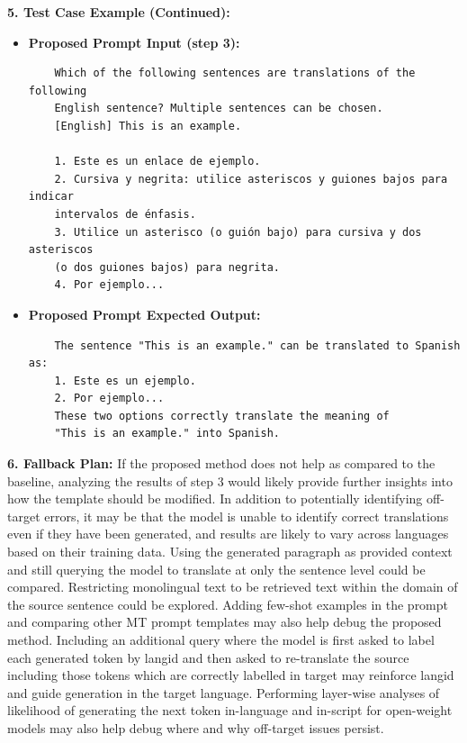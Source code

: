 


\newpage



\begin{tcolorbox}[colback=blue!5!white,colframe=blue!75!black,title=\textbf{Translation with LLMs through Prompting with Long-Form Context (Part 3)}]
\small 
    \textbf{5. Test Case Example (Continued):}
    \begin{itemize}
            \item \textbf{Proposed Prompt Input (step 3):}
            \begin{verbatim}
    Which of the following sentences are translations of the following 
    English sentence? Multiple sentences can be chosen.
    [English] This is an example.

    1. Este es un enlace de ejemplo.
    2. Cursiva y negrita: utilice asteriscos y guiones bajos para indicar 
    intervalos de énfasis.
    3. Utilice un asterisco (o guión bajo) para cursiva y dos asteriscos 
    (o dos guiones bajos) para negrita.
    4. Por ejemplo...
            \end{verbatim}
            \item \textbf{Proposed Prompt Expected Output:}
            \begin{verbatim}
    The sentence "This is an example." can be translated to Spanish as:
    1. Este es un ejemplo.
    2. Por ejemplo...
    These two options correctly translate the meaning of 
    "This is an example." into Spanish.
            \end{verbatim}
        \end{itemize}

    \textbf{6. Fallback Plan:} If the proposed method does not help as compared to the baseline, analyzing the results of step 3 would likely provide further insights into how the template should be modified. In addition to potentially identifying off-target errors, it may be that the model is unable to identify correct translations even if they have been generated, and results are likely to vary across languages based on their training data. Using the generated paragraph as provided context and still querying the model to translate at only the sentence level could be compared. Restricting monolingual text to be retrieved text within the domain of the source sentence could be explored. Adding few-shot examples in the prompt and comparing other MT prompt templates may also help debug the proposed method. Including an additional query where the model is first asked to label each generated token by langid and then asked to re-translate the source including those tokens which are correctly labelled in target may reinforce langid and guide generation in the target language. Performing layer-wise analyses of likelihood of generating the next token in-language and in-script for open-weight models may also help debug where and why off-target issues persist.

\end{tcolorbox}


